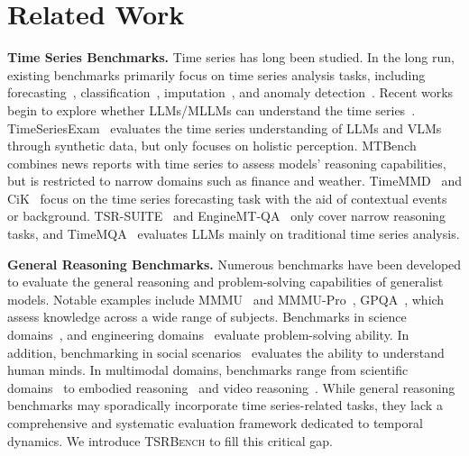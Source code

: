 \documentclass{article}
\theoremstyle{plain}
\theoremstyle{definition}
\theoremstyle{remark}
\newcommand\ours{\textsc{TSRBench}\xspace}
\theoremstyle{plain}
\begin{document}
\section{Related Work}
\textbf{Time Series Benchmarks.} 
Time series has long been studied. In the long run, existing benchmarks primarily focus on time series analysis tasks, including forecasting~\citep{godahewa2021monash, bauer2021libra, qiu2024tfb, wang2024deep, li2025tsfm, hu2025fintsb}, classification~\citep{ismail2019deep, ruiz2020benchmarking}, imputation~\citep{du2024tsi, kazijevs2023deep}, and anomaly detection~\citep{lai2021revisiting, wenig2022timeeval, zhou2024can}. Recent works begin to explore whether LLMs/MLLMs can understand the time series~\citep{tan2024language, merrill2024language}. TimeSeriesExam~\citep{cai2024timeseriesexam} evaluates the time series understanding of LLMs and VLMs through synthetic data, but only focuses on holistic perception. MTBench~\citep{chen2025mtbench} combines news reports with time series to assess models’ reasoning capabilities, but is restricted to narrow domains such as finance and weather. TimeMMD~\citep{liu2024time} and CiK~\citep{williams2024context} focus on the time series forecasting task with the aid of contextual events or background. TSR-SUITE~\citep{guan2025timeomni} and EngineMT-QA~\citep{wang2025itformer} only cover narrow reasoning tasks, and TimeMQA~\citep{kong2025time} evaluates LLMs mainly on traditional time series analysis.

\textbf{General Reasoning Benchmarks.} Numerous benchmarks have been developed to evaluate the
general reasoning and problem-solving capabilities of generalist models. 
Notable examples include MMMU~\citep{yue2024mmmu} and
MMMU-Pro~\citep{yue2025mmmu}, GPQA~\citep{rein2024gpqa}, which assess knowledge across a wide range of subjects. Benchmarks in science domains~\citep{zhao2025prism, wang2025physunibench, he2024olympiadbench, xu2025ugmathbench, zou2024dynamath}, and engineering domains~\citep{syed2024benchmarking, kevian2024capabilities, guo2025toward} evaluate problem-solving ability. In addition, benchmarking in social scenarios~\citep{le2019revisiting, kim2023fantom, yu2025persuasivetom} evaluates the ability to understand human minds. In multimodal domains, benchmarks range from scientific domains~\citep{lu2023mathvista, wang2024measuring} to embodied reasoning~\citep{yang2025embodiedbench, du2024embspatial} and video reasoning~\citep{li2024videovista, cheng2025video}. While general reasoning benchmarks may sporadically incorporate time series-related tasks, they lack a comprehensive and systematic evaluation framework dedicated to temporal dynamics. We introduce \ours to fill this critical gap.
\end{document}
